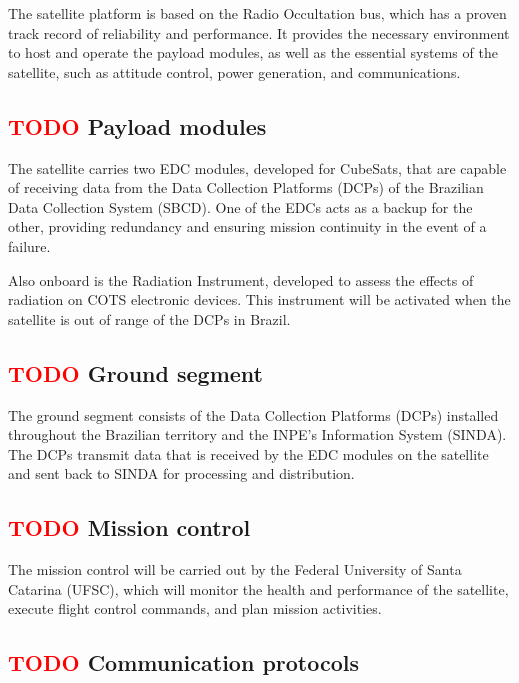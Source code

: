 The satellite platform is based on the Radio Occultation bus, which has a proven track record of reliability and performance. It provides the necessary environment to host and operate the payload modules, as well as the essential systems of the satellite, such as attitude control, power generation, and communications.

\subsection{ \textcolor{red}{TODO} Payload modules}

The satellite carries two EDC modules, developed for CubeSats, that are capable of receiving data from the Data Collection Platforms (DCPs) of the Brazilian Data Collection System (SBCD). One of the EDCs acts as a backup for the other, providing redundancy and ensuring mission continuity in the event of a failure.

Also onboard is the Radiation Instrument, developed to assess the effects of radiation on COTS electronic devices. This instrument will be activated when the satellite is out of range of the DCPs in Brazil.

\subsection{ \textcolor{red}{TODO} Ground segment}

The ground segment consists of the Data Collection Platforms (DCPs) installed throughout the Brazilian territory and the INPE's Information System (SINDA). The DCPs transmit data that is received by the EDC modules on the satellite and sent back to SINDA for processing and distribution.

\subsection{ \textcolor{red}{TODO} Mission control}

The mission control will be carried out by the Federal University of Santa Catarina (UFSC), which will monitor the health and performance of the satellite, execute flight control commands, and plan mission activities.

\subsection{ \textcolor{red}{TODO} Communication protocols}


